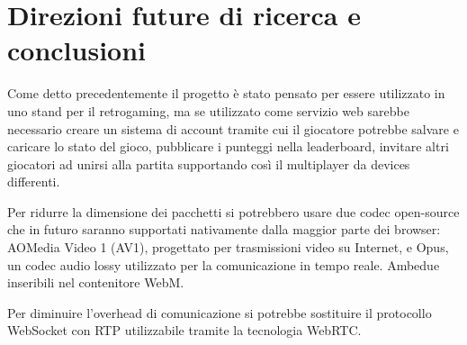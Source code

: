 %
%

\chapter*{Direzioni future di ricerca e conclusioni}

Come detto precedentemente il progetto è stato pensato per essere utilizzato in uno stand per il retrogaming, ma se utilizzato come servizio web sarebbe necessario creare un sistema di account tramite cui il giocatore potrebbe salvare e caricare lo stato del gioco, pubblicare i punteggi nella leaderboard, invitare altri giocatori ad unirsi alla partita supportando così il multiplayer da devices differenti.

Per ridurre la dimensione dei pacchetti si potrebbero usare due codec open-source che in futuro saranno supportati nativamente dalla maggior parte dei browser: AOMedia Video 1 (AV1), progettato per trasmissioni video su Internet, e Opus, un codec audio lossy utilizzato per la comunicazione in tempo reale. Ambedue inseribili nel contenitore WebM.

Per diminuire l'overhead di comunicazione si potrebbe sostituire il protocollo WebSocket con RTP utilizzabile tramite la tecnologia WebRTC.